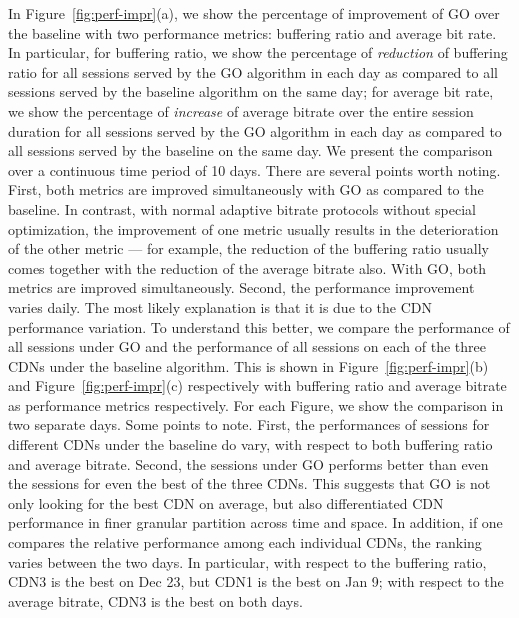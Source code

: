 In Figure~\ref{fig:perf-impr}(a), we show the percentage of improvement of GO over the baseline with two performance metrics: buffering ratio and average bit rate.  In particular, for buffering ratio, we show the percentage of {\em reduction} of buffering ratio for all sessions served by the GO algorithm in each day as compared to all sessions served by the baseline algorithm on the same day; for average bit rate, we show the percentage of {\em increase} of average bitrate over the entire session duration for all sessions served by the GO algorithm in each day as compared to all sessions served by the baseline on the same day.  We present the comparison over a continuous time period of 10 days. There are several points worth noting. First, both metrics are improved simultaneously with GO as compared to the baseline. In contrast, with normal adaptive bitrate protocols without special optimization, the improvement of one metric usually results in the deterioration of the other metric — for example, the reduction of the buffering ratio usually comes together with the reduction of the average bitrate also.   With GO, both metrics are 
improved simultaneously.  Second, the performance improvement varies daily.  The most likely explanation is that it is due to the CDN performance variation.  To understand this better, we compare the performance of all sessions under GO and the performance of all sessions on each of the three CDNs under the baseline algorithm. This is shown in Figure~\ref{fig:perf-impr}(b) and Figure~\ref{fig:perf-impr}(c) respectively with buffering ratio and average bitrate as performance metrics respectively.  For each Figure, we show the comparison in two separate days.  Some points to note. First, the performances of sessions for different CDNs under the baseline do vary, with respect to both buffering ratio and average bitrate. Second, the sessions under GO performs better than even the sessions for even the best of the three CDNs. This suggests that GO is not only looking for the best CDN on average, but also 
differentiated CDN performance in finer granular partition across time and space.  In addition, if one compares the relative performance among each individual CDNs, the ranking varies between the two days. In particular, with respect to the buffering ratio, CDN3 is the best on Dec 23, but CDN1 is the best on Jan 9; with respect to the average bitrate, CDN3 is the best on both days.  
 
